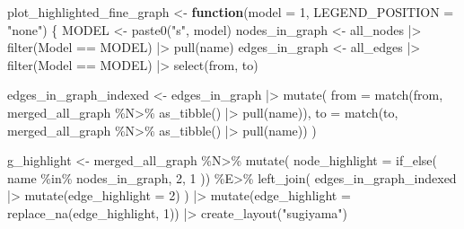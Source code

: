 \documentclass[
  letterpaper,
  DIV=11,
  numbers=noendperiod]{scrartcl}
\newenvironment{Shaded}{\begin{snugshade}}{\end{snugshade}}
\newcommand{\AttributeTok}[1]{\textcolor[rgb]{0.40,0.45,0.13}{#1}}
\newcommand{\ControlFlowTok}[1]{\textcolor[rgb]{0.00,0.23,0.31}{\textbf{#1}}}
\newcommand{\DecValTok}[1]{\textcolor[rgb]{0.68,0.00,0.00}{#1}}
\newcommand{\FunctionTok}[1]{\textcolor[rgb]{0.28,0.35,0.67}{#1}}
\newcommand{\NormalTok}[1]{\textcolor[rgb]{0.00,0.23,0.31}{#1}}
\newcommand{\OtherTok}[1]{\textcolor[rgb]{0.00,0.23,0.31}{#1}}
\newcommand{\SpecialCharTok}[1]{\textcolor[rgb]{0.37,0.37,0.37}{#1}}
\newcommand{\StringTok}[1]{\textcolor[rgb]{0.13,0.47,0.30}{#1}}
\begin{document}
\begin{Shaded}
\begin{Highlighting}[]
\NormalTok{plot\_highlighted\_fine\_graph }\OtherTok{\textless{}{-}} \ControlFlowTok{function}\NormalTok{(}\AttributeTok{model =} \DecValTok{1}\NormalTok{, }\AttributeTok{LEGEND\_POSITION =} \StringTok{"none"}\NormalTok{) \{}
\NormalTok{    MODEL }\OtherTok{\textless{}{-}} \FunctionTok{paste0}\NormalTok{(}\StringTok{"s"}\NormalTok{, model)}
\NormalTok{    nodes\_in\_graph }\OtherTok{\textless{}{-}}\NormalTok{ all\_nodes }\SpecialCharTok{|\textgreater{}} 
        \FunctionTok{filter}\NormalTok{(Model }\SpecialCharTok{==}\NormalTok{ MODEL) }\SpecialCharTok{|\textgreater{}} 
        \FunctionTok{pull}\NormalTok{(name)}
\NormalTok{    edges\_in\_graph }\OtherTok{\textless{}{-}}\NormalTok{ all\_edges }\SpecialCharTok{|\textgreater{}} 
        \FunctionTok{filter}\NormalTok{(Model }\SpecialCharTok{==}\NormalTok{ MODEL) }\SpecialCharTok{|\textgreater{}} 
        \FunctionTok{select}\NormalTok{(from, to)}
    
\NormalTok{    edges\_in\_graph\_indexed }\OtherTok{\textless{}{-}} 
\NormalTok{        edges\_in\_graph }\SpecialCharTok{|\textgreater{}} 
        \FunctionTok{mutate}\NormalTok{(}
            \AttributeTok{from =} \FunctionTok{match}\NormalTok{(from, merged\_all\_graph }\SpecialCharTok{\%N\textgreater{}\%} \FunctionTok{as\_tibble}\NormalTok{() }\SpecialCharTok{|\textgreater{}} \FunctionTok{pull}\NormalTok{(name)),}
            \AttributeTok{to =} \FunctionTok{match}\NormalTok{(to, merged\_all\_graph }\SpecialCharTok{\%N\textgreater{}\%} \FunctionTok{as\_tibble}\NormalTok{() }\SpecialCharTok{|\textgreater{}} \FunctionTok{pull}\NormalTok{(name))}
\NormalTok{        )}
    
\NormalTok{    g\_highlight }\OtherTok{\textless{}{-}}\NormalTok{ merged\_all\_graph }\SpecialCharTok{\%N\textgreater{}\%}
        \FunctionTok{mutate}\NormalTok{(}
            \AttributeTok{node\_highlight =} \FunctionTok{if\_else}\NormalTok{(}
\NormalTok{                name }\SpecialCharTok{\%in\%}\NormalTok{ nodes\_in\_graph, }\DecValTok{2}\NormalTok{, }\DecValTok{1}
\NormalTok{            )) }\SpecialCharTok{\%E\textgreater{}\%}
        \FunctionTok{left\_join}\NormalTok{(}
\NormalTok{            edges\_in\_graph\_indexed }\SpecialCharTok{|\textgreater{}} 
                \FunctionTok{mutate}\NormalTok{(}\AttributeTok{edge\_highlight =} \DecValTok{2}\NormalTok{)}
\NormalTok{        ) }\SpecialCharTok{|\textgreater{}} 
        \FunctionTok{mutate}\NormalTok{(}\AttributeTok{edge\_highlight =} \FunctionTok{replace\_na}\NormalTok{(edge\_highlight, }\DecValTok{1}\NormalTok{)) }\SpecialCharTok{|\textgreater{}} 
        \FunctionTok{create\_layout}\NormalTok{(}\StringTok{"sugiyama"}\NormalTok{)}
    

\end{Highlighting}
\end{Shaded}
\end{document}
